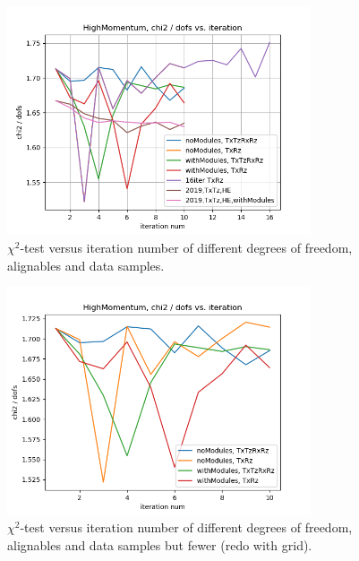 \begin{figure}
  \centering
  \includegraphics[width=0.8\textwidth]{plots/nov_19/Figure_2.png}
  \caption{$\chi^2$-test versus iteration number of different degrees of freedom, alignables and data samples.}
  \label{fig:fig2}
\end{figure}

\begin{figure}
  \centering
  \includegraphics[width=0.8\textwidth]{plots/nov_21/chi2_vs_iter_all.png}
  \caption{$\chi^2$-test versus iteration number of different degrees of freedom, alignables and data samples but fewer (redo with grid).}
  \label{fig:chi2iter}
\end{figure}

